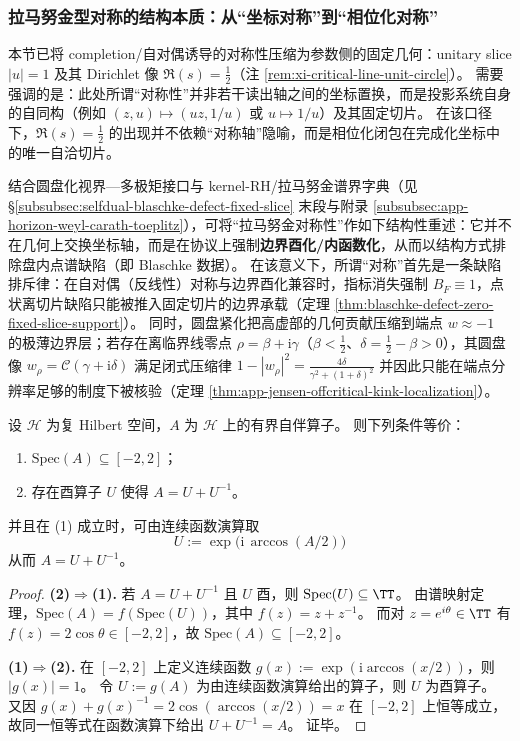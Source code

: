 \subsubsection{拉马努金型对称的结构本质：从“坐标对称”到“相位化对称”}\label{subsubsec:ramanujan-phase-lift-symmetry}
本节已将 completion/自对偶诱导的对称性压缩为参数侧的固定几何：unitary slice \(|u|=1\) 及其 Dirichlet 像 \(\Re(s)=\tfrac12\)（注 \ref{rem:xi-critical-line-unit-circle}）。
需要强调的是：此处所谓“对称性”并非若干读出轴之间的坐标置换，而是投影系统自身的自同构（例如 \((z,u)\mapsto(uz,1/u)\) 或 \(u\mapsto 1/u\)）及其固定切片。
在该口径下，\(\Re(s)=\tfrac12\) 的出现并不依赖“对称轴”隐喻，而是相位化闭包在完成化坐标中的唯一自洽切片。
\par
结合圆盘化视界—多极矩接口与 kernel-RH/拉马努金谱界字典（见 \S\ref{subsubsec:selfdual-blaschke-defect-fixed-slice} 末段与附录 \ref{subsubsec:app-horizon-weyl-carath-toeplitz}），可将“拉马努金对称性”作如下结构性重述：它并不在几何上交换坐标轴，而是在协议上强制\textbf{边界酉化/内函数化}，从而以结构方式排除盘内点谱缺陷（即 Blaschke 数据）。
在该意义下，所谓“对称”首先是一条缺陷排斥律：在自对偶（反线性）对称与边界酉化兼容时，指标消失强制 \(B_F\equiv 1\)，点状离切片缺陷只能被推入固定切片的边界承载（定理 \ref{thm:blaschke-defect-zero-fixed-slice-support}）。
同时，圆盘紧化把高虚部的几何贡献压缩到端点 \(w\approx-1\) 的极薄边界层；若存在离临界线零点 \(\rho=\beta+\mathrm{i}\gamma\)（\(\beta<\tfrac12\)、\(\delta=\tfrac12-\beta>0\)），其圆盘像 \(w_\rho=\mathcal{C}(\gamma+\mathrm{i}\delta)\) 满足闭式压缩律
\(
1-|w_\rho|^2=\frac{4\delta}{\gamma^2+(1+\delta)^2}
\)
并因此只能在端点分辨率足够的制度下被核验（定理 \ref{thm:app-jensen-offcritical-kink-localization}）。

\begin{theorem}\label{thm:phase-lift-spectral-bound}
设 \(\mathcal H\) 为复 Hilbert 空间，\(A\) 为 \(\mathcal H\) 上的有界自伴算子。
则下列条件等价：
\begin{enumerate}
  \item \(\mathrm{Spec}(A)\subseteq[-2,2]\)；
  \item 存在酉算子 \(U\) 使得 \(A=U+U^{-1}\)。
\end{enumerate}
并且在 (1) 成立时，可由连续函数演算取
\[
\boxed{\ U:=\exp\!\bigl(\mathrm{i}\,\arccos(A/2)\bigr)\ }
\]
从而 \(A=U+U^{-1}\)。
\end{theorem}
\begin{proof}
\textbf{(2)\(\Rightarrow\)(1).}
若 \(A=U+U^{-1}\) 且 \(U\) 酉，则 \(\mathrm{Spec}(U)\subseteq\TT\)。
由谱映射定理，\(\mathrm{Spec}(A)=f(\mathrm{Spec}(U))\)，其中 \(f(z)=z+z^{-1}\)。
而对 \(z=e^{i\theta}\in\TT\) 有 \(f(z)=2\cos\theta\in[-2,2]\)，故 \(\mathrm{Spec}(A)\subseteq[-2,2]\)。
\par
\textbf{(1)\(\Rightarrow\)(2).}
在 \([-2,2]\) 上定义连续函数 \(g(x):=\exp(\mathrm{i}\arccos(x/2))\)，则 \(|g(x)|=1\)。
令 \(U:=g(A)\) 为由连续函数演算给出的算子，则 \(U\) 为酉算子。
又因 \(g(x)+g(x)^{-1}=2\cos(\arccos(x/2))=x\) 在 \([-2,2]\) 上恒等成立，
故同一恒等式在函数演算下给出
\(
U+U^{-1}=A
\)。
证毕。
\end{proof}

